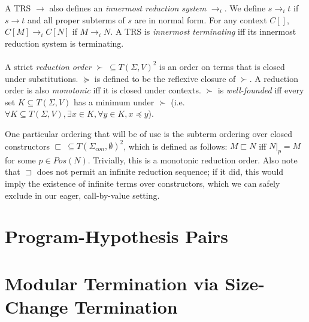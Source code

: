 \documentclass{article}
\theoremstyle{definition}
\newcommand{\subterm}{\sqsubset}
\newcommand{\supterm}{\sqsupset}
\begin{document}
A TRS $\longrightarrow$ also defines an \emph{innermost reduction system} $\longrightarrow_i$. We define $s \longrightarrow_i t$ if $s \longrightarrow t$ and all proper subterms of $s$ are in normal form. For any context $C[]$, $C[M] \longrightarrow_i C[N]$ if $M \longrightarrow_i N$. A TRS is \emph{innermost terminating} iff its innermost reduction system is terminating. 
\\~\\
A strict \emph{reduction order} $\succ ~ \subseteq T(\Sigma, V)^2$ is an order on terms that is closed under substitutions.  $\succeq$ is defined to be the reflexive closure of $\succ$. A reduction order is also \emph{monotonic} iff it is closed under contexts. $\succ$ is \emph{well-founded} iff every set $K \subseteq T(\Sigma, V)$ has a minimum under $\succ$ (i.e. $\forall K \subseteq T(\Sigma, V), \exists x \in K, \forall y \in K, x \preceq y$).

One particular ordering that will be of use is the subterm ordering over closed constructors $\subterm ~\subseteq T(\Sigma_{con}, \emptyset)^2$, which is defined as follows: $M \subterm N$ iff $N|_p = M$ for some  $p \in Pos(N)$. Trivially, this is a monotonic reduction order. Also note that $\supterm$ does not permit an infinite reduction sequence; if it did, this would imply the existence of infinite terms over constructors, which we can safely exclude in our eager, call-by-value setting.  

\section{Program-Hypothesis Pairs}

\section{Modular Termination via Size-Change Termination}
\end{document}
